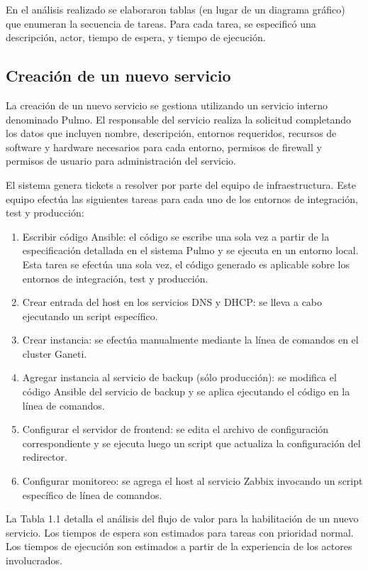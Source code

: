 En el análisis realizado se elaboraron tablas (en lugar de un diagrama
gráfico) que enumeran la secuencia de tareas. Para cada tarea, se
especificó una descripción, actor, tiempo de espera, y tiempo de
ejecución.

\subsection{Creación de un nuevo servicio}

La creación de un nuevo servicio se gestiona utilizando un servicio
interno denominado Pulmo. El responsable del servicio realiza la
solicitud completando los datos que incluyen nombre, descripción,
entornos requeridos, recursos de software y hardware necesarios para
cada entorno, permisos de firewall y permisos de usuario para
administración del servicio.

El sistema genera tickets a resolver por parte del equipo de
infraestructura. Este equipo efectúa las siguientes tareas para cada
uno de los entornos de integración, test y producción:

\begin{enumerate}
\item Escribir código Ansible: el código se escribe una sola vez a
  partir de la especificación detallada en el sistema Pulmo y se
  ejecuta en un entorno local. Esta tarea se efectúa una sola vez, el
  código generado es aplicable sobre los entornos de integración, test
  y producción.
\item Crear entrada del host en los servicios DNS y DHCP: se lleva a
  cabo ejecutando un script específico.
\item Crear instancia: se efectúa manualmente mediante la línea de
  comandos en el cluster Ganeti.
\item Agregar instancia al servicio de backup (sólo producción): se
  modifica el código Ansible del servicio de backup y se aplica
  ejecutando el código en la línea de comandos.
\item Configurar el servidor de frontend: se edita el archivo de
  configuración correspondiente y se ejecuta luego un script que
  actualiza la configuración del redirector.
\item Configurar monitoreo: se agrega el host al servicio Zabbix
  invocando un script específico de línea de comandos.
\end{enumerate}
La Tabla 1.1 detalla el análisis del flujo de valor para la
habilitación de un nuevo servicio. Los tiempos de espera son estimados
para tareas con prioridad normal. Los tiempos de ejecución son
estimados a partir de la experiencia de los actores involucrados.


